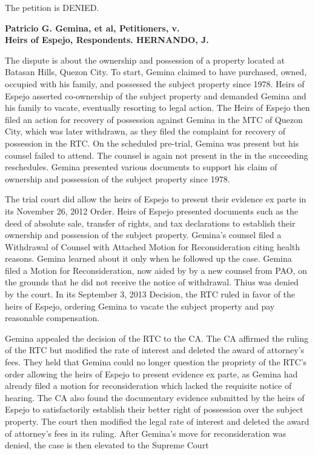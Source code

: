 \documentclass[
12pt,
oneside,
onehalfspacing,
headsepline
]{DigestCollection}
\begin{document}
The petition is DENIED.

\label{ec054410-0a0f-11ef-932c-63c852f65e48}


\noindent\textbf{Patricio G. Gemina, et al, Petitioners, v. \\Heirs of Espejo, Respondents. HERNANDO, J.}\vspace{0.4cm}

The dispute is about the ownership and possession of a property located at Batasan Hills, Quezon City. To start, Gemina claimed to have purchased, owned, occupied with his family, and possessed the subject property since 1978. Heirs of Espejo asserted co-ownership of the subject property and demanded Gemina and his family to vacate, eventually resorting to legal action. The Heirs of Espejo then filed an action for recovery of possession against Gemina in the MTC of Quezon City, which was later withdrawn, as they filed the complaint for recovery of possession in the RTC. On the scheduled pre-trial, Gemina was present but his counsel failed to attend. The counsel is again not present in the in the succeeding reschedules. Gemina presented various documents to support his claim of ownership and possession of the subject property since 1978.

The trial court did allow the heirs of Espejo to present their evidence ex parte in its November 26, 2012 Order. Heirs of Espejo presented documents such as the deed of absolute sale, transfer of rights, and tax declarations to establish their ownership and possession of the subject property. Gemina's counsel filed a Withdrawal of Counsel with Attached Motion for Reconsideration citing health reasons. Gemina learned about it only when he followed up the case. Gemina filed a Motion for Reconsideration, now aided by by a new counsel from PAO, on the grounds that he did not receive the notice of withdrawal. Thius was denied by the court. In its September 3, 2013 Decision, the RTC ruled in favor of the heirs of Espejo, ordering Gemina to vacate the subject property and pay reasonable compensation.

Gemina appealed the decision of the RTC to the CA. The CA affirmed the ruling of the RTC but modified the rate of interest and deleted the award of attorney's fees. They held that Gemina could no longer question the propriety of the RTC's order allowing the heirs of Espejo to present evidence ex parte, as Gemina had already filed a motion for reconsideration which lacked the requisite notice of hearing. The CA also found the documentary evidence submitted by the heirs of Espejo to satisfactorily establish their better right of possession over the subject property. The court then modified the legal rate of interest and deleted the award of attorney's fees in its ruling. After Gemina's move for reconsideration was denied, the case is then elevated to the Supreme Court
\end{document}

